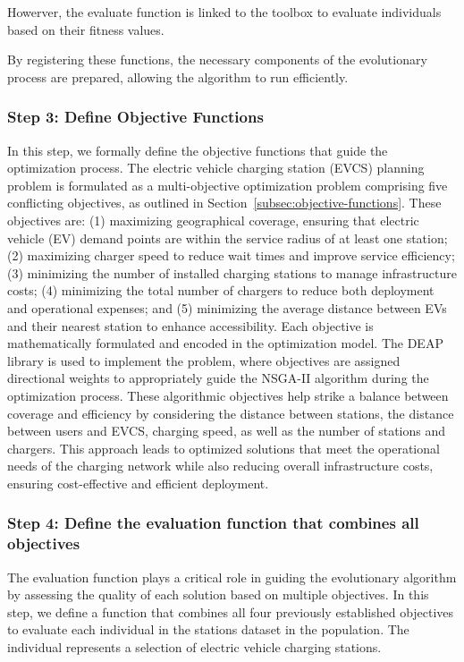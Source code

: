 Howerver, the evaluate function is linked to the toolbox to evaluate individuals based on their fitness values.

By registering these functions, the necessary components of the evolutionary process are prepared, allowing the algorithm to run efficiently.

\subsubsection*{Step 3: Define Objective Functions}

In this step, we formally define the objective functions that guide the optimization process. The electric vehicle charging station (EVCS) planning problem is formulated as a multi-objective optimization problem comprising five conflicting objectives, as outlined in Section~\ref{subsec:objective-functions}. These objectives are: (1) maximizing geographical coverage, ensuring that electric vehicle (EV) demand points are within the service radius of at least one station; (2) maximizing charger speed to reduce wait times and improve service efficiency; (3) minimizing the number of installed charging stations to manage infrastructure costs; (4) minimizing the total number of chargers to reduce both deployment and operational expenses; and (5) minimizing the average distance between EVs and their nearest station to enhance accessibility. Each objective is mathematically formulated and encoded in the optimization model. The DEAP library is used to implement the problem, where objectives are assigned directional weights to appropriately guide the NSGA-II algorithm during the optimization process.
\newline
These algorithmic objectives help strike a balance between coverage and efficiency by considering the distance between stations, the distance between users and EVCS, charging speed, as well as the number of stations and chargers. This approach leads to optimized solutions that meet the operational needs of the charging network while also reducing overall infrastructure costs, ensuring cost-effective and efficient deployment.
\newline
\subsubsection*{Step 4: Define the evaluation function that combines all objectives}
The evaluation function plays a critical role in guiding the evolutionary algorithm by assessing the quality of each solution based on multiple objectives\cite{Multi-Objective Optimization using Evolutionary Algorithms}. In this step, we define a function that combines all four previously established objectives to evaluate each individual in the stations dataset in the population. The individual represents a selection of electric vehicle charging stations.

